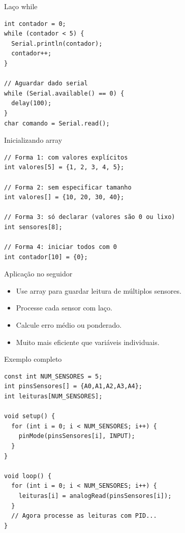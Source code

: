 \documentclass[10pt]{beamer}
\begin{document}
\begin{frame}[fragile]{Laço while}
\begin{lstlisting}
int contador = 0;
while (contador < 5) {
  Serial.println(contador);
  contador++;
}

// Aguardar dado serial
while (Serial.available() == 0) {
  delay(100);
}
char comando = Serial.read();
\end{lstlisting}
\end{frame}

\begin{frame}[fragile]{Inicializando array}
\begin{lstlisting}
// Forma 1: com valores explícitos
int valores[5] = {1, 2, 3, 4, 5};

// Forma 2: sem especificar tamanho
int valores[] = {10, 20, 30, 40};

// Forma 3: só declarar (valores são 0 ou lixo)
int sensores[8];

// Forma 4: iniciar todos com 0
int contador[10] = {0};
\end{lstlisting}
\end{frame}

\begin{frame}{Aplicação no seguidor}
  \begin{itemize}
    \item Use array para guardar leitura de múltiplos sensores.
    \item Processe cada sensor com laço.
    \item Calcule erro médio ou ponderado.
    \item Muito mais eficiente que variáveis individuais.
  \end{itemize}
\end{frame}

\begin{frame}[fragile]{Exemplo completo}
\begin{lstlisting}
const int NUM_SENSORES = 5;
int pinsSensores[] = {A0,A1,A2,A3,A4};
int leituras[NUM_SENSORES];

void setup() {
  for (int i = 0; i < NUM_SENSORES; i++) {
    pinMode(pinsSensores[i], INPUT);
  }
}

void loop() {
  for (int i = 0; i < NUM_SENSORES; i++) {
    leituras[i] = analogRead(pinsSensores[i]);
  }
  // Agora processe as leituras com PID...
}
\end{lstlisting}
\end{frame}
\end{document}
